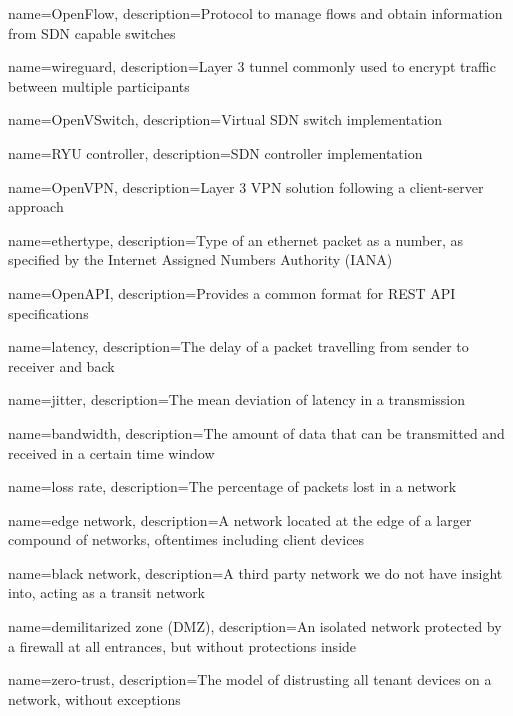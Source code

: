 \usepackage{glossaries}%
{
    name=OpenFlow,
    description={Protocol to manage flows and obtain information from SDN capable switches}
}

{
    name=wireguard,
    description={Layer 3 tunnel commonly used to encrypt traffic between multiple participants}
}

{
    name=OpenVSwitch,
    description={Virtual SDN switch implementation}
}

{
    name=RYU controller,
    description={SDN controller implementation}
}

{
    name=OpenVPN,
    description={Layer 3 VPN solution following a client-server approach}
}

{
    name=ethertype,
    description={Type of an ethernet packet as a number, as specified by the Internet Assigned Numbers Authority (IANA)}
}

{
    name=OpenAPI,
    description={Provides a common format for REST API specifications}
}

{
    name=latency,
    description={The delay of a packet travelling from sender to receiver and back}
}

{
    name=jitter,
    description={The mean deviation of latency in a transmission}
}

{
    name=bandwidth,
    description={The amount of data that can be transmitted and received in a certain time window}
}

{
    name=loss rate,
    description={The percentage of packets lost in a network}
}

{
    name=edge network,
    description={A network located at the edge of a larger compound of networks, oftentimes including client devices}
}

{
    name=black network,
    description={A third party network we do not have insight into, acting as a transit network}
}

{
    name=demilitarized zone (DMZ),
    description={An isolated network protected by a firewall at all entrances, but without protections inside}
}

{
    name=zero-trust,
    description={The model of distrusting all tenant devices on a network, without exceptions}
}

